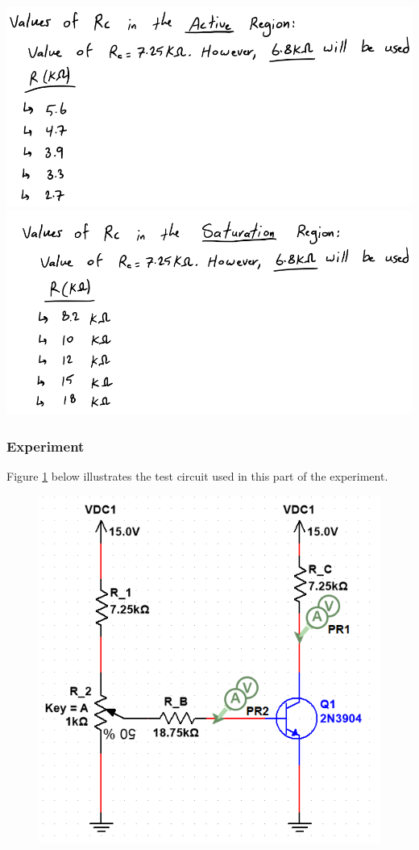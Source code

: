 \documentclass{article}
\begin{document}
	\includegraphics[width=\linewidth]{prelab4.png}
	\includegraphics[width=\linewidth]{prelab5.png}
	
	\pagebreak
	
	\subsubsection{Experiment}
	Figure \ref{f5} below illustrates the test circuit used in this part of the experiment.
	
	\begin{figure}[!ht]
		\centering
		\includegraphics[width=0.6\linewidth]{d1-part2-circuit.png}
		\label{f5}
	\end{figure}
	
\end{document}
